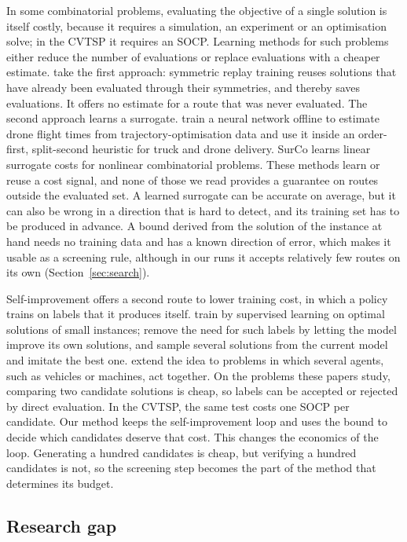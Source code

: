 \documentclass[preprint,12pt,authoryear]{elsarticle}
\begin{document}
In some combinatorial problems, evaluating the objective of a single solution is itself costly, because it requires a simulation, an experiment or an optimisation solve; in the CVTSP it requires an SOCP. Learning methods for such problems either reduce the number of evaluations or replace evaluations with a cheaper estimate. \citet{kim2024} take the first approach: symmetric replay training reuses solutions that have already been evaluated through their symmetries, and thereby saves evaluations. It offers no estimate for a route that was never evaluated. The second approach learns a surrogate. \citet{sun2026} train a neural network offline to estimate drone flight times from trajectory-optimisation data and use it inside an order-first, split-second heuristic for truck and drone delivery. SurCo \citep{ferber2023} learns linear surrogate costs for nonlinear combinatorial problems. These methods learn or reuse a cost signal, and none of those we read provides a guarantee on routes outside the evaluated set. A learned surrogate can be accurate on average, but it can also be wrong in a direction that is hard to detect, and its training set has to be produced in advance. A bound derived from the solution of the instance at hand needs no training data and has a known direction of error, which makes it usable as a screening rule, although in our runs it accepts relatively few routes on its own (Section~\ref{sec:search}).

Self-improvement offers a second route to lower training cost, in which a policy trains on labels that it produces itself. \citet{luo2023} train by supervised learning on optimal solutions of small instances; \citet{luo2024} remove the need for such labels by letting the model improve its own solutions, and \citet{pirnay2024} sample several solutions from the current model and imitate the best one. \citet{luttmann2025} extend the idea to problems in which several agents, such as vehicles or machines, act together. On the problems these papers study, comparing two candidate solutions is cheap, so labels can be accepted or rejected by direct evaluation. In the CVTSP, the same test costs one SOCP per candidate. Our method keeps the self-improvement loop and uses the bound to decide which candidates deserve that cost. This changes the economics of the loop. Generating a hundred candidates is cheap, but verifying a hundred candidates is not, so the screening step becomes the part of the method that determines its budget.

\subsection{Research gap}
\label{sec:gap}
\end{document}
